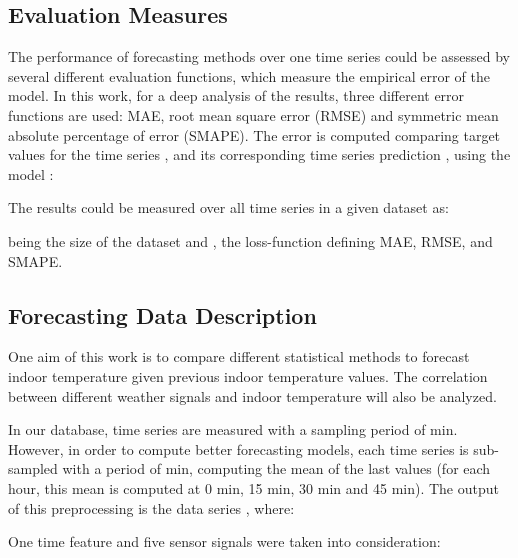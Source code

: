 \documentclass[energies,article,accept,moreauthors,pdftex,12pt,a4paper]{mdpi}
\begin{document}
\subsection{Evaluation Measures}\label{sec:evalmeasures}

The performance of forecasting methods over one time series could be assessed by
several different evaluation functions, which measure the empirical error of the
model. In this work, for a deep analysis of the results, three different error
functions are used: MAE, root mean square error (RMSE)
and symmetric mean absolute percentage of error (SMAPE). The error is computed
comparing target values for the time series , and its corresponding time series prediction , using the model :

\vspace {-12pt}


The results could be measured over all time series in a given dataset  as:
\vspace {-3pt}

 being the size of the
dataset and , the loss-function defining MAE, RMSE, and SMAPE.

\subsection{Forecasting Data Description}


One aim of this work is to compare different statistical methods to forecast
indoor temperature given previous indoor temperature values. The correlation
between different weather signals and indoor temperature will also be analyzed.

In our database, time series are measured with a sampling period of 
min. However, in order to compute better forecasting models,
each time series is sub-sampled with a period of  min, computing the mean of
the last  values (for each hour, this mean is computed at 0 min, 15
min, 30 min and 45 min). The output of this preprocessing is the
data series , where:

\vspace {-6pt}



\vspace {6pt}

One time feature and five sensor signals were taken into consideration:
\end{document}
